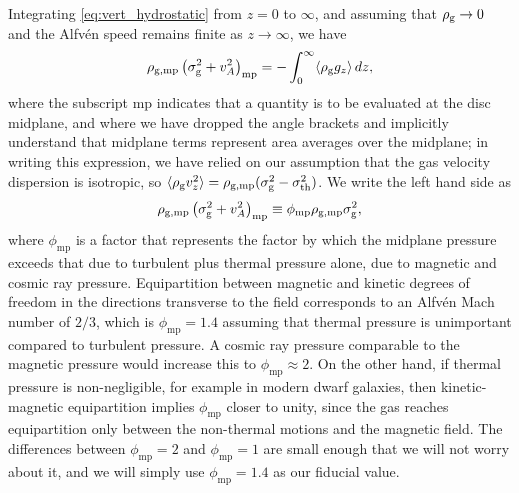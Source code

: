 \documentclass[useAMS,usenatbib]{mn2e}
\newcommand{\phimp}{\phi_{\mathrm{mp}}}
\newcommand{\rhogmp}{\rho_{\rm g,mp}}
\begin{document}
Integrating \autoref{eq:vert_hydrostatic} from $z=0$ to $\infty$, and assuming that $\rho_{\rm g}\rightarrow 0$ and the Alfv\'en speed remains finite as $z\rightarrow\infty$, we have
\begin{equation}
\label{eq:vert_hydrostatic1}
\rhogmp \left(\sigma_{\rm g}^2 + v_A^2\right)_{\rm mp} = -\int_0^\infty \langle \rho_{\rm g} g_z\rangle \, dz,
\end{equation}
where the subscript mp indicates that a quantity is to be evaluated at the disc midplane, and where we have dropped the angle brackets and implicitly understand that midplane terms represent area averages over the midplane; in writing this expression, we have relied on our assumption that the gas velocity dispersion is isotropic, so $\langle \rho_{\rm g} v_z^2\rangle = \rhogmp (\sigma_{\rm g}^2 - \sigma_{\rm th}^2)$. We write the left hand side as
\begin{equation}
\label{eq:phimp}
\rhogmp \left(\sigma_{\rm g}^2 + v_A^2\right)_{\rm mp} \equiv \phimp \rhogmp \sigma_{\rm g}^2,
\end{equation}
where $\phimp$ is a factor that represents the factor by which the midplane pressure exceeds that due to turbulent plus thermal pressure alone, due to magnetic and cosmic ray pressure. Equipartition between magnetic and kinetic degrees of freedom in the directions transverse to the field corresponds to an Alfv\'en Mach number of $2/3$, which is $\phimp = 1.4$ assuming that thermal pressure is unimportant compared to turbulent pressure. A cosmic ray pressure comparable to the magnetic pressure would increase this to $\phimp \approx 2$. On the other hand, if thermal pressure is non-negligible, for example in modern dwarf galaxies, then kinetic-magnetic equipartition implies $\phimp$ closer to unity, since the gas reaches equipartition only between the non-thermal motions and the magnetic field. The differences between $\phimp = 2$ and $\phimp=1$ are small enough that we will not worry about it, and we will simply use $\phimp=1.4$ as our fiducial value.
\end{document}
